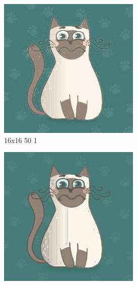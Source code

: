 \documentclass[12pt,a4paper]{article}
\begin{document}
\begin{figure}[htb]
\medskip
\begin{subfigure}{0.25\textwidth}
  \includegraphics[width=\linewidth]{images/cartoon/16-16-50-1}
  \caption{16x16 50 1}
  \label{fig:4}
\end{subfigure}\hfil %
\begin{subfigure}{0.25\textwidth}
  \includegraphics[width=\linewidth]{images/cartoon/16-16-100-05}

\end{subfigure}
\end{figure}
\end{document}
